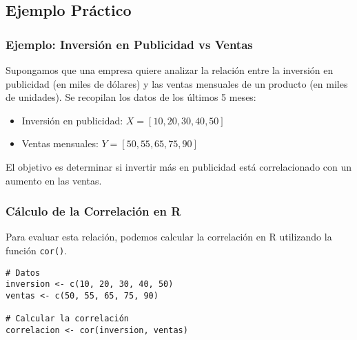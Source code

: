 \documentclass[aspectratio=169]{beamer}
\begin{document}


\subsection{Ejemplo Práctico}
\begin{frame}
\frametitle{Ejemplo: Inversión en Publicidad vs Ventas}
Supongamos que una empresa quiere analizar la relación entre la inversión en publicidad (en miles de dólares) y las ventas mensuales de un producto (en miles de unidades). Se recopilan los datos de los últimos 5 meses:

\begin{itemize}
    \item Inversión en publicidad: \( X = [10, 20, 30, 40, 50] \)
    \item Ventas mensuales: \( Y = [50, 55, 65, 75, 90] \)
\end{itemize}

El objetivo es determinar si invertir más en publicidad está correlacionado con un aumento en las ventas.
\end{frame}

\begin{frame}[fragile]
\frametitle{Cálculo de la Correlación en R}
Para evaluar esta relación, podemos calcular la correlación en R utilizando la función \texttt{cor()}.

\begin{verbatim}
# Datos
inversion <- c(10, 20, 30, 40, 50)
ventas <- c(50, 55, 65, 75, 90)

# Calcular la correlación
correlacion <- cor(inversion, ventas)
\end{verbatim}

\end{frame}
\end{document}
